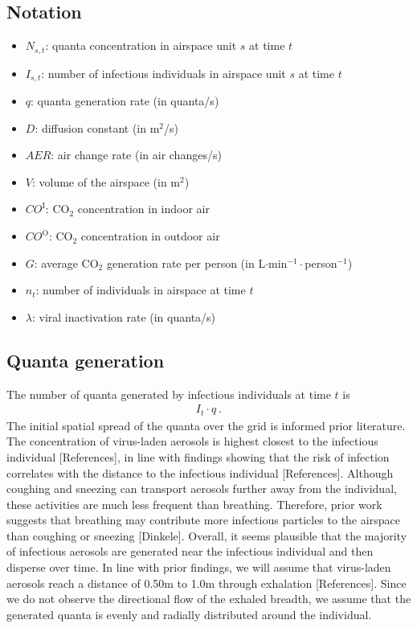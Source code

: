 \documentclass[fleqn,11pt]{wlscirep_supp}
\begin{document}
\subsection{Notation}

\begin{itemize}
    \item $N_{s,t}$: quanta concentration in airspace unit $s$ at time $t$
    \item $I_{s,t}$: number of infectious individuals in airspace unit $s$ at time $t$
    \item $q$: quanta generation rate (in quanta/s)
    \item $D$: diffusion constant (in m$^2$/s)
    \item $AER$: air change rate (in air changes/s)
    \item $V$: volume of the airspace (in m$^2$)
    \item $CO^{\text{I}}$: CO$_2$ concentration in indoor air
    \item $CO^{\text{O}}$: CO$_2$ concentration in outdoor air
    \item $G$: average CO$_2$ generation rate per person (in L$\cdot$min$^{-1}\cdot$person$^{-1}$)
    \item $n_t$: number of individuals in airspace at time $t$
    \item $\lambda$: viral inactivation rate (in quanta/s)
\end{itemize}

\subsection{Quanta generation}\label{sec:quanta-generation}

The number of quanta generated by infectious individuals at time $t$ is 
\begin{align}\label{eq:generation}
    I_t \cdot q ~.
\end{align}
The initial spatial spread of the quanta over the grid is informed prior literature. The concentration of virus-laden aerosols is highest closest to the infectious individual [References], in line with findings showing that the risk of infection correlates with the distance to the infectious individual [References]. Although coughing and sneezing can transport aerosols further away from the individual, these activities are much less frequent than breathing. Therefore, prior work suggests that breathing may contribute more infectious particles to the airspace than coughing or sneezing [Dinkele]. Overall, it seems plausible that the majority of infectious aerosols are generated near the infectious individual and then disperse over time. In line with prior findings, we will assume that virus-laden aerosols reach a distance of 0.50m to 1.0m through exhalation [References]. Since we do not observe the directional flow of the exhaled breadth, we assume that the generated quanta is evenly and radially distributed around the individual. 
\end{document}
